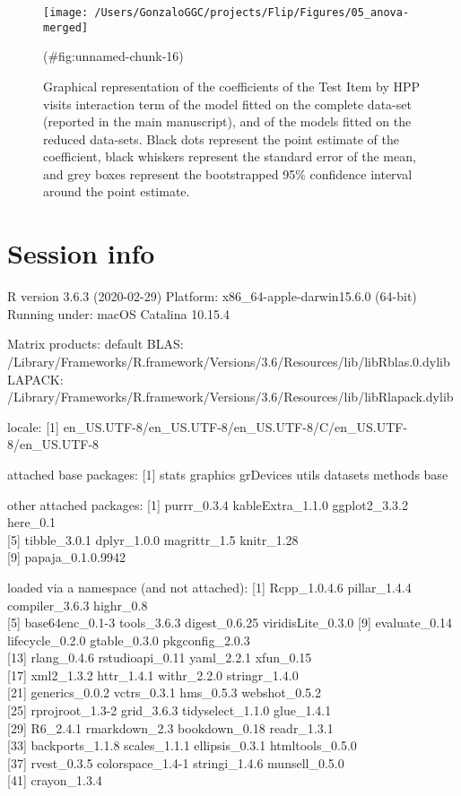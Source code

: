 \begin{appendix}
\begin{figure}
\texttt{[image: /Users/GonzaloGGC/projects/Flip/Figures/05\_anova-merged]} \caption{Graphical representation of the coefficients of the Test Item by HPP visits interaction term of the model fitted on the complete data-set (reported in the main manuscript), and of the models fitted on the reduced data-sets. Black dots represent the point estimate of the coefficient, black whiskers represent the standard error of the mean, and grey boxes represent the bootstrapped 95\% confidence interval around the point estimate.}(\#fig:unnamed-chunk-16)
\end{figure}

\hypertarget{session-info}{%
\section*{Session info}\label{session-info}}

R version 3.6.3 (2020-02-29) Platform: x86\_64-apple-darwin15.6.0
(64-bit) Running under: macOS Catalina 10.15.4

Matrix products: default BLAS:
/Library/Frameworks/R.framework/Versions/3.6/Resources/lib/libRblas.0.dylib
LAPACK:
/Library/Frameworks/R.framework/Versions/3.6/Resources/lib/libRlapack.dylib

locale: {[}1{]}
en\_US.UTF-8/en\_US.UTF-8/en\_US.UTF-8/C/en\_US.UTF-8/en\_US.UTF-8

attached base packages: {[}1{]} stats graphics grDevices utils datasets
methods base

other attached packages: {[}1{]} purrr\_0.3.4 kableExtra\_1.1.0
ggplot2\_3.3.2 here\_0.1\\
{[}5{]} tibble\_3.0.1 dplyr\_1.0.0 magrittr\_1.5 knitr\_1.28\\
{[}9{]} papaja\_0.1.0.9942

loaded via a namespace (and not attached): {[}1{]} Rcpp\_1.0.4.6
pillar\_1.4.4 compiler\_3.6.3 highr\_0.8\\
{[}5{]} base64enc\_0.1-3 tools\_3.6.3 digest\_0.6.25 viridisLite\_0.3.0
{[}9{]} evaluate\_0.14 lifecycle\_0.2.0 gtable\_0.3.0 pkgconfig\_2.0.3\\
{[}13{]} rlang\_0.4.6 rstudioapi\_0.11 yaml\_2.2.1 xfun\_0.15\\
{[}17{]} xml2\_1.3.2 httr\_1.4.1 withr\_2.2.0 stringr\_1.4.0\\
{[}21{]} generics\_0.0.2 vctrs\_0.3.1 hms\_0.5.3 webshot\_0.5.2\\
{[}25{]} rprojroot\_1.3-2 grid\_3.6.3 tidyselect\_1.1.0 glue\_1.4.1\\
{[}29{]} R6\_2.4.1 rmarkdown\_2.3 bookdown\_0.18 readr\_1.3.1\\
{[}33{]} backports\_1.1.8 scales\_1.1.1 ellipsis\_0.3.1
htmltools\_0.5.0\\
{[}37{]} rvest\_0.3.5 colorspace\_1.4-1 stringi\_1.4.6 munsell\_0.5.0\\
{[}41{]} crayon\_1.3.4


\end{appendix}
